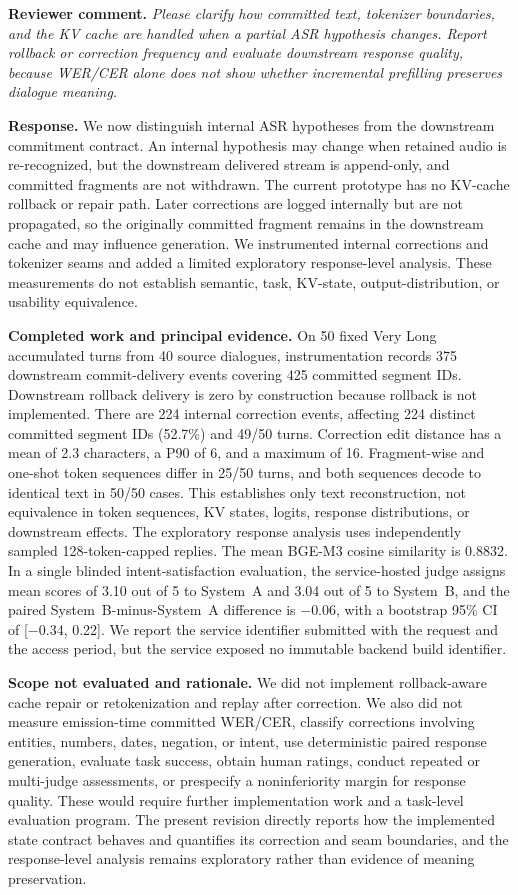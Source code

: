 \documentclass[11pt]{article}
\newcommand{\reviewcomment}[1]{\vspace{0.4em}\noindent\textbf{Reviewer comment.} \emph{#1}}
\newcommand{\response}{\vspace{0.25em}\noindent\textbf{Response.} }
\newcommand{\completed}{\vspace{0.25em}\noindent\textbf{Completed work and principal evidence.} }
\newcommand{\scope}{\vspace{0.25em}\noindent\textbf{Scope not evaluated and rationale.} }
\begin{document}
\reviewcomment{Please clarify how committed text, tokenizer boundaries, and the KV cache are handled when a partial ASR hypothesis changes. Report rollback or correction frequency and evaluate downstream response quality, because WER/CER alone does not show whether incremental prefilling preserves dialogue meaning.}

\response We now distinguish internal ASR hypotheses from the downstream commitment contract. An internal hypothesis may change when retained audio is re-recognized, but the downstream delivered stream is append-only, and committed fragments are not withdrawn. The current prototype has no KV-cache rollback or repair path. Later corrections are logged internally but are not propagated, so the originally committed fragment remains in the downstream cache and may influence generation. We instrumented internal corrections and tokenizer seams and added a limited exploratory response-level analysis. These measurements do not establish semantic, task, KV-state, output-distribution, or usability equivalence.

\completed On 50 fixed Very Long accumulated turns from 40 source dialogues, instrumentation records 375 downstream commit-delivery events covering 425 committed segment IDs. Downstream rollback delivery is zero by construction because rollback is not implemented. There are 224 internal correction events, affecting 224 distinct committed segment IDs (52.7\%) and 49/50 turns. Correction edit distance has a mean of 2.3 characters, a P90 of 6, and a maximum of 16. Fragment-wise and one-shot token sequences differ in 25/50 turns, and both sequences decode to identical text in 50/50 cases. This establishes only text reconstruction, not equivalence in token sequences, KV states, logits, response distributions, or downstream effects. The exploratory response analysis uses independently sampled 128-token-capped replies. The mean BGE-M3 cosine similarity is 0.8832. In a single blinded intent-satisfaction evaluation, the service-hosted judge assigns mean scores of 3.10 out of 5 to System~A and 3.04 out of 5 to System~B, and the paired System~B-minus-System~A difference is $-0.06$, with a bootstrap 95\% CI of [$-0.34$, 0.22]. We report the service identifier submitted with the request and the access period, but the service exposed no immutable backend build identifier.

\scope We did not implement rollback-aware cache repair or retokenization and replay after correction. We also did not measure emission-time committed WER/CER, classify corrections involving entities, numbers, dates, negation, or intent, use deterministic paired response generation, evaluate task success, obtain human ratings, conduct repeated or multi-judge assessments, or prespecify a noninferiority margin for response quality. These would require further implementation work and a task-level evaluation program. The present revision directly reports how the implemented state contract behaves and quantifies its correction and seam boundaries, and the response-level analysis remains exploratory rather than evidence of meaning preservation.
\end{document}
